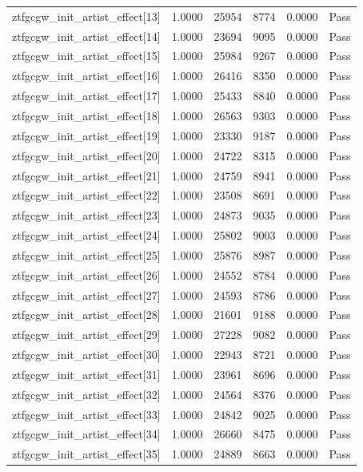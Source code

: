 \begin{table}[htbp]
\begin{tabular}{llrrll}
ztfgcgw\_init\_artist\_effect[13] & 1.0000 & 25954 & 8774 & 0.0000 & Pass \\
ztfgcgw\_init\_artist\_effect[14] & 1.0000 & 23694 & 9095 & 0.0000 & Pass \\
ztfgcgw\_init\_artist\_effect[15] & 1.0000 & 25984 & 9267 & 0.0000 & Pass \\
ztfgcgw\_init\_artist\_effect[16] & 1.0000 & 26416 & 8350 & 0.0000 & Pass \\
ztfgcgw\_init\_artist\_effect[17] & 1.0000 & 25433 & 8840 & 0.0000 & Pass \\
ztfgcgw\_init\_artist\_effect[18] & 1.0000 & 26563 & 9303 & 0.0000 & Pass \\
ztfgcgw\_init\_artist\_effect[19] & 1.0000 & 23330 & 9187 & 0.0000 & Pass \\
ztfgcgw\_init\_artist\_effect[20] & 1.0000 & 24722 & 8315 & 0.0000 & Pass \\
ztfgcgw\_init\_artist\_effect[21] & 1.0000 & 24759 & 8941 & 0.0000 & Pass \\
ztfgcgw\_init\_artist\_effect[22] & 1.0000 & 23508 & 8691 & 0.0000 & Pass \\
ztfgcgw\_init\_artist\_effect[23] & 1.0000 & 24873 & 9035 & 0.0000 & Pass \\
ztfgcgw\_init\_artist\_effect[24] & 1.0000 & 25802 & 9003 & 0.0000 & Pass \\
ztfgcgw\_init\_artist\_effect[25] & 1.0000 & 25876 & 8987 & 0.0000 & Pass \\
ztfgcgw\_init\_artist\_effect[26] & 1.0000 & 24552 & 8784 & 0.0000 & Pass \\
ztfgcgw\_init\_artist\_effect[27] & 1.0000 & 24593 & 8786 & 0.0000 & Pass \\
ztfgcgw\_init\_artist\_effect[28] & 1.0000 & 21601 & 9188 & 0.0000 & Pass \\
ztfgcgw\_init\_artist\_effect[29] & 1.0000 & 27228 & 9082 & 0.0000 & Pass \\
ztfgcgw\_init\_artist\_effect[30] & 1.0000 & 22943 & 8721 & 0.0000 & Pass \\
ztfgcgw\_init\_artist\_effect[31] & 1.0000 & 23961 & 8696 & 0.0000 & Pass \\
ztfgcgw\_init\_artist\_effect[32] & 1.0000 & 24564 & 8376 & 0.0000 & Pass \\
ztfgcgw\_init\_artist\_effect[33] & 1.0000 & 24842 & 9025 & 0.0000 & Pass \\
ztfgcgw\_init\_artist\_effect[34] & 1.0000 & 26660 & 8475 & 0.0000 & Pass \\
ztfgcgw\_init\_artist\_effect[35] & 1.0000 & 24889 & 8663 & 0.0000 & Pass \\

\end{tabular}
\end{table}
